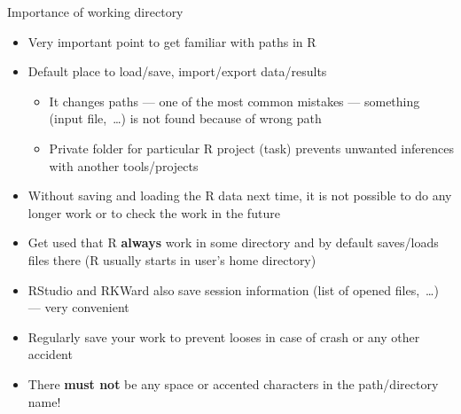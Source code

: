 \documentclass[compress, xelatex, 11pt, xcolor=svgnames, aspectratio=169,
	hyperref={
		bookmarks=true,
		unicode=true,
		colorlinks=true,
		pdftitle={Molecular data in R},
		plainpages=false,
		pdfauthor={Vojtech Zeisek},
		pdfsubject={Course about phylogeny and evolution in R},
		pdfcreator={XeLaTeX},
		pdfkeywords={R, evolution, phylogeny, molecular data},
		linkcolor=Crimson, %
		anchorcolor=Magenta, %
		citecolor=Magenta, %
		filecolor=Magenta, %
		menucolor=Magenta, %
		urlcolor=DodgerBlue, %
		},
	url={hyphens, lowtilde} %
	]{beamer}
\begin{document}
\begin{frame}{Importance of working directory}
	\begin{itemize}
		\item Very important point to get familiar with paths in R
		\item Default place to load/save, import/export data/results
		\begin{itemize}
			\item It changes paths --- one of the most common mistakes --- something (input file,~\ldots) is not found because of wrong path
			\item Private folder for particular R project (task) prevents unwanted inferences with another tools/projects
		\end{itemize}
		\item Without saving and loading the R data next time, it is not possible to do any longer work or to check the work in the future
		\item \alert{Get used that R \textbf{always} work in some directory and by default saves/loads files there} (R usually starts in user's home directory)
		\item RStudio and RKWard also save session information (list of opened files,~\ldots) --- very convenient
		\item Regularly save your work to prevent looses in case of crash or any other accident
		\item \alert{There \textbf{must not} be any space or accented characters in the path/directory name!}
	\end{itemize}
\end{frame}
\end{document}
